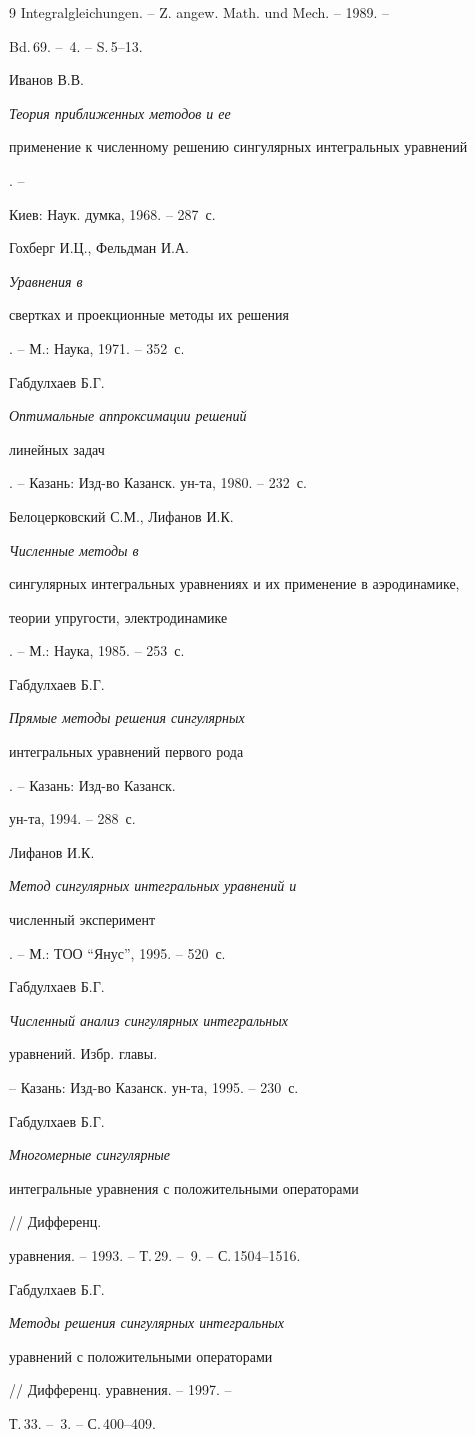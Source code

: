 \begin{thebibliography}{9}
{Integralgleichungen}. -- Z. angew. Math. und Mech. --  1989. --


Bd.\,69. -- \No\,4. -- S.\,5--13.


 Иванов В.В. {\it Теория приближенных методов и ее


применение к численному решению сингулярных интегральных уравнений}. --


Киев: Наук. думка, 1968. -- 287~с.


 Гохберг И.Ц., Фельдман И.А. {\it Уравнения в


свертках и проекционные методы их решения}. -- М.: Наука, 1971. -- 352~с.


 Габдулхаев Б.Г. {\it Оптимальные аппроксимации решений


линейных задач}. -- Казань: Изд-во Казанск. ун-та, 1980. -- 232~с.


 Белоцерковский С.М., Лифанов И.К. {\it Численные методы в


сингулярных интегральных уравнениях и их применение в аэродинамике,


теории упругости, электродинамике}. -- М.: Наука, 1985. -- 253~с.


 Габдулхаев Б.Г. {\it Прямые методы решения сингулярных


интегральных уравнений первого рода}. -- Казань: Изд-во Казанск. 


ун-та, 1994. -- 288~с.


 Лифанов И.К. {\it Метод сингулярных интегральных уравнений и


численный эксперимент}. -- М.: ТОО ``Янус'', 1995. -- 520~с.


 Габдулхаев Б.Г. {\it Численный анализ сингулярных интегральных


уравнений. Избр. главы.} -- Казань: Изд-во Казанск. ун-та, 1995. -- 230~с.


 Габдулхаев Б.Г. {\it Многомерные сингулярные


интегральные уравнения с положительными операторами} // Дифференц.


уравнения. -- 1993. -- Т.\,29. -- \No\,9. -- С.\,1504--1516.


 Габдулхаев Б.Г. {\it Методы решения сингулярных интегральных


уравнений с положительными операторами} // Дифференц. уравнения. -- 1997. --


Т.\,33. -- \No\,3. -- С.\,400--409.



\end{thebibliography}

